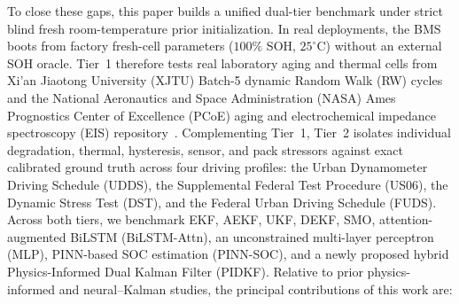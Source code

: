 \documentclass[10pt,a4paper]{article}
\begin{document}
To close these gaps, this paper builds a unified dual-tier benchmark under strict blind fresh room-temperature prior initialization. In real deployments, the BMS boots from factory fresh-cell parameters ($100\%$ SOH, $25^\circ\text{C}$) without an external SOH oracle. Tier~1 therefore tests real laboratory aging and thermal cells from Xi'an Jiaotong University (XJTU) Batch-5 dynamic Random Walk (RW) cycles~\cite{Wang2024xjtu} and the National Aeronautics and Space Administration (NASA) Ames Prognostics Center of Excellence (PCoE) aging and electrochemical impedance spectroscopy (EIS) repository~\cite{Saha2007nasa}. Complementing Tier~1, Tier~2 isolates individual degradation, thermal, hysteresis, sensor, and pack stressors against exact calibrated ground truth across four driving profiles: the Urban Dynamometer Driving Schedule (UDDS), the Supplemental Federal Test Procedure (US06), the Dynamic Stress Test (DST), and the Federal Urban Driving Schedule (FUDS). Across both tiers, we benchmark EKF, AEKF, UKF, DEKF, SMO, attention-augmented BiLSTM (BiLSTM-Attn), an unconstrained multi-layer perceptron (MLP), PINN-based SOC estimation (PINN-SOC), and a newly proposed hybrid Physics-Informed Dual Kalman Filter (PIDKF). Relative to prior physics-informed and neural--Kalman studies, the principal contributions of this work are:
\end{document}
